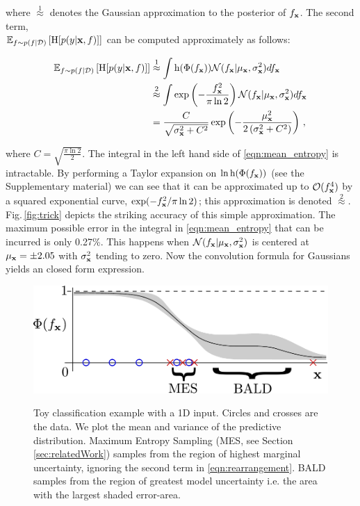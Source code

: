 where $\stackrel{1}{\approx}$ denotes the Gaussian approximation to the posterior of $f_{\mathbf{x}}$. The second term, \\ $\mathbb{E}_{f \sim p(f\vert\mathcal{D})} \left[ \mathrm{H}[p(y\vert\mathbf{x}, f)] \right]$ can be computed approximately as follows:

\begin{align}
        \mathbb{E}_{f \sim p(f\vert\mathcal{D})} \left[ \mathrm{H}[p(y\vert\mathbf{x}, f)] \right] &\stackrel{1}{\approx}\int \mathrm{h}(\Phi(f_{\mathbf{x}})) \mathcal{N}(f_{\mathbf{x}}| \mu_{\mathbf{x}},\sigma_{\mathbf{x}}^2) df_{\mathbf{x}}\label{eqn:mean_entropy}\\
        &\stackrel{2}{\approx} \int \exp\left(-\frac{f_{\mathbf{x}}^2}{\pi\ln2}\right) \mathcal{N}(f_{\mathbf{x}}| \mu_{\mathbf{x}},\sigma_{\mathbf{x}}^2)df_{\mathbf{x}}\notag\\ 
        &= \frac{C}{\sqrt{\sigma_{\mathbf{x}}^2 + C^2}}\exp\left(-\frac{\mu_{\mathbf{x}}^2}{2\left(\sigma_{\mathbf{x}}^2 + C^2\right)}\right)\,,\notag
\end{align}

where $C=\sqrt{\frac{\pi\ln2}{2}}$. The integral in the left hand side of \eqref{eqn:mean_entropy} is intractable. By performing a Taylor expansion on $\ln \mathrm{h}(\Phi(f_{\mathbf{x}}))$ (see the Supplementary material) we can see that it can be approximated up to $\mathcal{O}(f_{\mathbf{x}}^4)$ by a squared exponential curve, $\exp(-f_{\mathbf{x}}^2/\pi\ln2)$; this approximation is denoted {\scriptsize $\stackrel{2}{\approx}$}. Fig.\,\ref{fig:trick} depicts the striking accuracy of this simple approximation. The maximum possible error in the integral in \eqref{eqn:mean_entropy} that can be incurred is only 0.27\%. This happens when $\mathcal{N}(f_{\mathbf{x}}| \mu_{\mathbf{x}},\sigma_{\mathbf{x}}^2)$ is centered at $\mu_{\mathbf{x}}=\pm 2.05$  with $\sigma_{\mathbf{x}}^2$ tending to zero. Now the convolution formula for Gaussians yields an closed form expression.

\begin{figure}[t]\centering
\includegraphics[scale = 0.5]{figs/BALD_eg.pdf} \\
\vskip-0.4cm
\caption{Toy classification example with a 1D input. Circles and crosses
are the data. We plot the mean and variance of the predictive
distribution. Maximum Entropy Sampling (MES, see Section \ref{sec:relatedWork})
samples from the region of highest marginal uncertainty, ignoring the
second term in \eqref{eqn:rearrangement}. BALD samples 
from the region of greatest model uncertainty i.e. the area with the largest 
shaded error-area. \label{fig:BALD}}
\end{figure}

